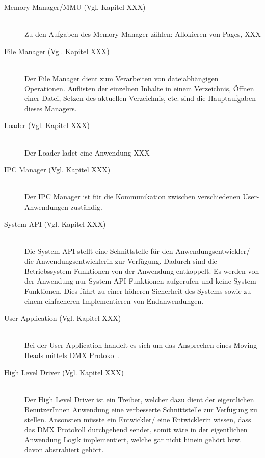 \begin{description}
	\item[Memory Manager/MMU (Vgl. Kapitel XXX)] \hfill \\
	Zu den Aufgaben des Memory Manager zählen: Allokieren von Pages, XXX \\

	\item[File Manager (Vgl. Kapitel XXX)] \hfill \\
	Der File Manager dient zum Verarbeiten von dateiabhängigen Operationen. Auflisten der einzelnen Inhalte in einem Verzeichnis, Öffnen einer Datei, Setzen des aktuellen Verzeichnis, etc. sind die Hauptaufgaben dieses Managers.
	
	\item[Loader (Vgl. Kapitel XXX)] \hfill \\
	Der Loader ladet eine Anwendung XXX
	
	\item[IPC Manager (Vgl. Kapitel XXX)] \hfill \\
	Der IPC Manager ist für die Kommunikation zwischen verschiedenen User-Anwendungen zuständig.
	
	\item[System API (Vgl. Kapitel XXX)] \hfill \\
	Die System API stellt eine Schnittstelle für den Anwendungsentwickler/ die Anwendungsentwicklerin zur Verfügung. Dadurch sind die Betriebssystem Funktionen von der Anwendung entkoppelt. Es werden von der Anwendung nur System API Funktionen aufgerufen und keine System Funktionen. Dies führt zu einer höheren Sicherheit des Systems sowie zu einem einfacheren Implementieren von Endanwendungen.
	
	\item[User Application (Vgl. Kapitel XXX)] \hfill \\
	Bei der User Application handelt es sich um das Ansprechen eines Moving Heads mittels DMX Protokoll.
	
	\item[High Level Driver (Vgl. Kapitel XXX)] \hfill \\
	Der High Level Driver ist ein Treiber, welcher dazu dient der eigentlichen BenutzerInnen Anwendung eine verbesserte Schnittstelle zur Verfügung zu stellen. Ansonsten müsste ein Entwickler/ eine Entwicklerin wissen, dass das DMX Protokoll durchgehend sendet, somit wäre in der eigentlichen Anwendung Logik implementiert, welche gar nicht hinein gehört bzw. davon abstrahiert gehört.
\end{description}

\pagebreak 